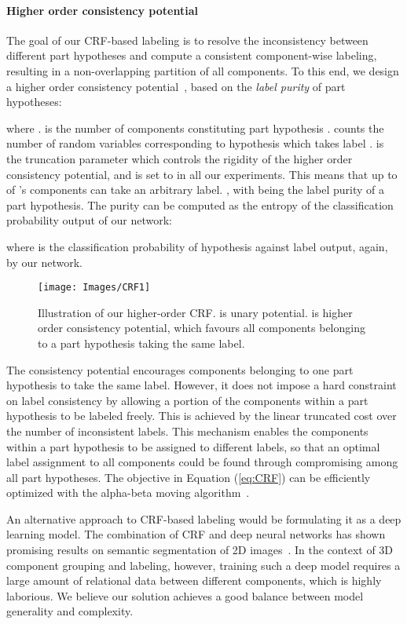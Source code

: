 \documentclass[acmtog]{acmart}
\begin{document}
{\paragraph{\textbf{Higher order consistency potential}}
The goal of our CRF-based labeling is to resolve the inconsistency between different
part hypotheses and compute a consistent component-wise labeling,
resulting in a non-overlapping partition of all components.
To this end, we design a higher order consistency potential~\cite{Kohli2008Graph,Park2012On},
based on the \emph{label purity} of part hypotheses:

where .
 is the number of components constituting part hypothesis .
 counts the number of random variables corresponding to hypothesis 
which takes label .
 is the truncation parameter which controls the rigidity of the higher order consistency potential,
and is set to  in all our experiments.
This means that up to  of 's components can take an arbitrary label.
,
with  being the label purity of a part hypothesis.
The purity can be computed as the entropy of the classification probability output of our network:

where  is the classification probability of hypothesis 
against label  output, again, by our network. } 


\begin{figure}[t]
  \centering
  \texttt{[image: Images/CRF1]}
  \caption{Illustration of our higher-order CRF.
 is unary potential.
 is higher order consistency potential, which favours all components belonging to a part hypothesis taking the same label.}
  \label{fig:CRF}
\end{figure}


The consistency potential encourages components
belonging to one part hypothesis to take the same label.
However, it does not impose a hard constraint on label consistency by allowing
a portion of the components within a part hypothesis to be labeled freely.
This is achieved by the linear truncated cost over the number of inconsistent labels.
This mechanism enables the components within a part hypothesis to be assigned to different labels,
so that an optimal label assignment to all components could be found through compromising among
all part hypotheses.
The objective in Equation (\ref{eq:CRF}) can be efficiently optimized
with the alpha-beta moving algorithm~\cite{Kohli2008Graph}.

An alternative approach to CRF-based labeling would be formulating it as a deep learning model. The combination of CRF and deep neural networks has shown promising results on semantic segmentation of 2D images~\cite{zheng2015}. In the context of 3D component grouping and labeling, however, training such a deep model requires a large amount of relational data between different components, which is highly laborious. We believe our solution achieves a good balance between model generality and complexity.
\end{document}
